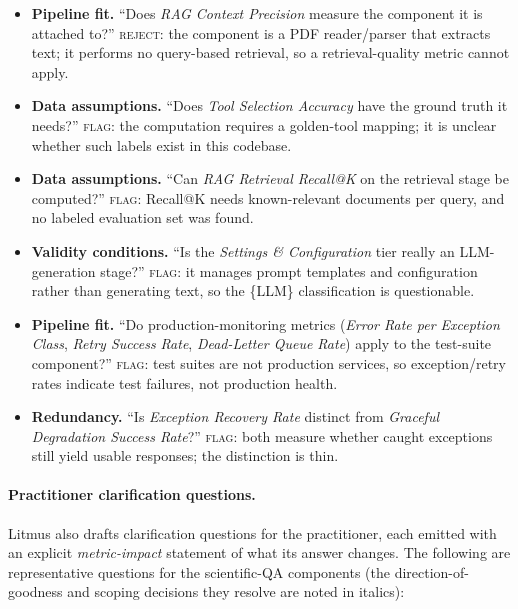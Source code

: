 \documentclass[11pt]{article}
\begin{document}
\begin{itemize}
\item \textbf{Pipeline fit.} ``Does \emph{RAG Context Precision} measure the component it is attached to?'' \textsc{reject}: the component is a PDF reader/parser that extracts text; it performs no query-based retrieval, so a retrieval-quality metric cannot apply.
\item \textbf{Data assumptions.} ``Does \emph{Tool Selection Accuracy} have the ground truth it needs?'' \textsc{flag}: the computation requires a golden-tool mapping; it is unclear whether such labels exist in this codebase.
\item \textbf{Data assumptions.} ``Can \emph{RAG Retrieval Recall@K} on the retrieval stage be computed?''
\textsc{flag}: Recall@K needs known-relevant documents per query, and no labeled evaluation set was found.
\item \textbf{Validity conditions.} ``Is the \emph{Settings \& Configuration} tier really an LLM-generation stage?'' \textsc{flag}: it manages prompt templates and configuration rather than generating text, so the \{LLM\} classification is questionable.
\item \textbf{Pipeline fit.} ``Do production-monitoring metrics (\emph{Error Rate per Exception Class}, \emph{Retry Success Rate}, \emph{Dead-Letter Queue Rate}) apply to the test-suite component?'' \textsc{flag}: test suites are not production services, so exception/retry rates indicate test failures, not production health.
\item \textbf{Redundancy.} ``Is \emph{Exception Recovery Rate} distinct from \emph{Graceful Degradation Success Rate}?'' \textsc{flag}: both measure whether caught exceptions still yield usable responses; the distinction is thin.
\end{itemize}

\paragraph{Practitioner clarification questions.}
Litmus also drafts clarification questions for the practitioner, each emitted with an explicit \emph{metric-impact} statement of what its answer changes. The following are representative questions for the scientific-QA components (the direction-of-goodness and scoping decisions they resolve are noted in italics):
\end{document}
